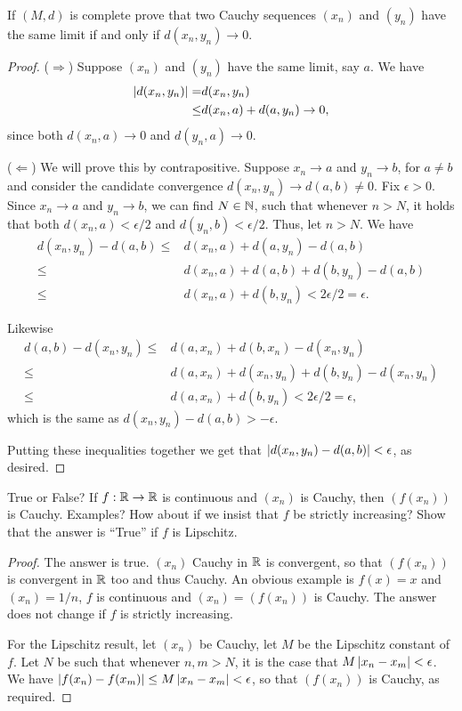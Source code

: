 \begin{exercise}{21}
If $(M,d)$ is complete prove that two Cauchy sequences $(x_n)$ and $(y_n)$ have the same limit if and only if $d(x_n,y_n)\to 0$.
\end{exercise}
\begin{proof}
($\Rightarrow$)
Suppose $(x_n)$ and $(y_n)$ have the same limit, say $a$.
We have
\begin{align*}
    \left\lvert d(x_n,y_n)\right\rvert
    =& d(x_n,y_n)\\
    \leq& d(x_n, a) + d(a, y_n) \to 0,
\end{align*}
since both $d(x_n,a)\to 0$ and $d(y_n,a)\to 0$.

($\Leftarrow$)
We will prove this by contrapositive.
Suppose $x_n\to a$ and $y_n\to b$, for $a\neq b$ and consider the candidate convergence $d(x_n,y_n)\to d(a,b)\neq 0$.
Fix $\epsilon>0$.
Since $x_n\to a$ and $y_n\to b$, we can find $N\in\mathbb{N}$, such that whenever $n>N$, it holds that both $d(x_n,a)<\epsilon/2$ and $d(y_n,b)<\epsilon/2$.
Thus, let $n>N$.
We have
\begin{align*}
    d(x_n,y_n) - d(a,b)
    \leq& d(x_n,a) + d(a,y_n) - d(a,b)\\
    \leq& d(x_n,a) + d(a,b) + d(b,y_n) - d(a,b)\\
    \leq& d(x_n, a) + d(b,y_n) < 2\epsilon/2 = \epsilon.
\end{align*}

Likewise
\begin{align*}
    d(a,b) - d(x_n,y_n)
    \leq& d(a,x_n) + d(b,x_n) - d(x_n,y_n)\\
    \leq& d(a,x_n) + d(x_n,y_n) + d(b,y_n) - d(x_n,y_n)\\
    \leq& d(a,x_n) + d(b,y_n) < 2\epsilon/2 = \epsilon,
\end{align*}
which is the same as $d(x_n,y_n)-d(a,b)>-\epsilon$.

Putting these inequalities together we get that $\left\lvert d(x_n,y_n)-d(a,b)\right\rvert<\epsilon$, as desired.
\end{proof} 

\begin{exercise}{25}
True or False?
If $f:\mathbb{R}\to\mathbb{R}$ is continuous and $(x_n)$ is Cauchy, then $(f(x_n))$ is Cauchy.
Examples?
How about if we insist that $f$ be strictly increasing?
Show that the answer is ``True'' if $f$ is Lipschitz.
\end{exercise}
\begin{proof}
The answer is true.
$(x_n)$ Cauchy in $\mathbb{R}$ is convergent, so that $(f(x_n))$ is convergent in $\mathbb{R}$ too and thus Cauchy.
An obvious example is $f(x)=x$ and $(x_n)=1/n$, $f$ is continuous and $(x_n)=(f(x_n))$ is Cauchy.
The answer does not change if $f$ is strictly increasing.

For the Lipschitz result, let $(x_n)$ be Cauchy, let $M$ be the Lipschitz constant of $f$.
Let $N$ be such that whenever $n,m>N$, it is the case that $M\left\lvert x_n-x_m\right\rvert<\epsilon$.
We have $\left\lvert f(x_n)-f(x_m)\right\rvert \leq M\left\lvert x_n-x_m\right\rvert < \epsilon$, so that $(f(x_n))$ is Cauchy, as required.
\end{proof} 

